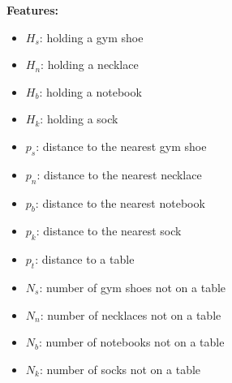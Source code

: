 \textbf{Features:}
\begin{itemize}[noitemsep]
    \item $H_s$: holding a gym shoe
    \item $H_n$: holding a necklace
    \item $H_b$: holding a notebook
    \item $H_k$: holding a sock
    \item $p_s$: distance to the nearest gym shoe
    \item $p_n$: distance to the nearest necklace
    \item $p_b$: distance to the nearest notebook
    \item $p_k$: distance to the nearest sock
    \item $p_t$: distance to a table
    \item $N_s$: number of gym shoes not on a table
    \item $N_n$: number of necklaces not on a table
    \item $N_b$: number of notebooks not on a table
    \item $N_k$: number of socks not on a table
\end{itemize}

